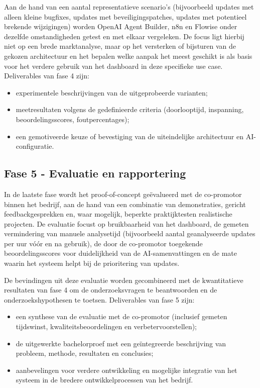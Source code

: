 Aan de hand van een aantal representatieve scenario’s (bijvoorbeeld updates met alleen kleine bugfixes, updates met beveiligingspatches, updates met potentieel brekende wijzigingen) worden OpenAI Agent Builder, n8n en Flowise onder dezelfde omstandigheden getest en met elkaar vergeleken. De focus ligt hierbij niet op een brede marktanalyse, maar op het versterken of bijsturen van de gekozen architectuur en het bepalen welke aanpak het meest geschikt is als basis voor het verdere gebruik van het dashboard in deze specifieke use case. Deliverables van fase 4 zijn:
\begin{itemize}
  \item experimentele beschrijvingen van de uitgeprobeerde varianten;
  \item meetresultaten volgens de gedefinieerde criteria (doorlooptijd, inspanning, beoordelingsscores, foutpercentages);
  \item een gemotiveerde keuze of bevestiging van de uiteindelijke architectuur en AI-configuratie.
\end{itemize}

\subsection{Fase 5 - Evaluatie en rapportering}
\label{sec:fase5}

In de laatste fase wordt het proof-of-concept geëvalueerd met de co-promotor binnen het bedrijf, aan de hand van een combinatie van demonstraties, gericht feedbackgesprekken en, waar mogelijk, beperkte praktijktesten realistische projecten. De evaluatie focust op bruikbaarheid van het dashboard, de gemeten vermindering van manuele analysetijd (bijvoorbeeld aantal geanalyseerde updates per uur vóór en na gebruik), de door de co-promotor toegekende beoordelingsscores voor duidelijkheid van de AI-samenvattingen en de mate waarin het systeem helpt bij de prioritering van updates.

De bevindingen uit deze evaluatie worden gecombineerd met de kwantitatieve resultaten van fase 4 om de onderzoeksvragen te beantwoorden en de onderzoekshypothesen te toetsen. Deliverables van fase 5 zijn:
\begin{itemize}
  \item een synthese van de evaluatie met de co-promotor (inclusief gemeten tijdswinst, kwaliteitsbeoordelingen en verbetervoorstellen);
  \item de uitgewerkte bachelorproef met een geïntegreerde beschrijving van probleem, methode, resultaten en conclusies;
  \item aanbevelingen voor verdere ontwikkeling en mogelijke integratie van het systeem in de bredere ontwikkelprocessen van het bedrijf.
\end{itemize}

